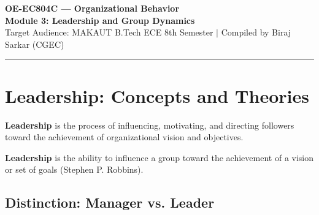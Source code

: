 \documentclass[11pt,a4paper]{article}
\begin{document}
\begin{center}
  {\LARGE \bfseries \color{myred} OE-EC804C --- Organizational Behavior}\\[6pt]
  {\Large \bfseries \color{myteal} Module 3: Leadership and Group Dynamics}\\[4pt]
  {\small \color{mydark} Target Audience: MAKAUT B.Tech ECE 8th Semester $|$ Compiled by Biraj Sarkar (CGEC)}
\end{center}
\vspace{-6pt}
\hrule
\vspace{10pt}

\begin{tcolorbox}[tikzbox, title={Module Contents}]
\small
\tableofcontents
\end{tcolorbox}
\vspace{10pt}

\section{Leadership: Concepts and Theories}

\textbf{Leadership} is the process of influencing, motivating, and directing followers toward the achievement of organizational vision and objectives.

\begin{tcolorbox}[defbox, title={Definition of Leadership}]
  \textbf{Leadership} is the ability to influence a group toward the achievement of a vision or set of goals (Stephen P. Robbins).
\end{tcolorbox}

\subsection{Distinction: Manager vs. Leader}
\end{document}

